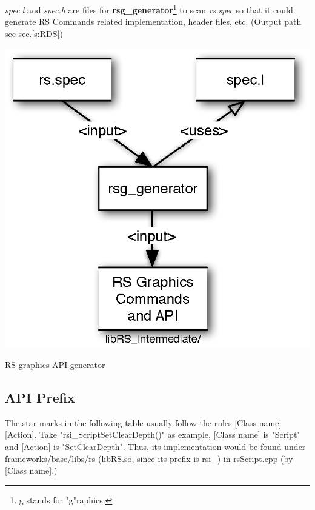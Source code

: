 \textit{spec.l} and \textit{spec.h} are files for \textbf{rsg\_generator}\footnote{g stands for "g"raphics.} to scan \textit{rs.spec} so that it could generate RS Commands related implementation, header files, etc. (Output path see sec.\ref{s:RDS})
\begin{center-figure}
	\includegraphics[scale=0.8]{fig/rsg_generator.eps}
	\caption{RS graphics API generator}
	\label{fig:rsg_generator}
\end{center-figure}

\subsection{API Prefix}
\label{ss:Prefix}
The star marks in the following table usually follow the rules [Class name][Action]. Take "rsi\_ScriptSetClearDepth()" as example, [Class name] is "Script" and [Action] is "SetClearDepth". Thus, its implementation would be found under frameworks/base/libs/rs (libRS.so, since its prefix is rsi\_) in rsScript.cpp (by [Class name].)

\addtocounter{footnote}{1}
\addtocounter{footnote}{1}
\footnotetext[\value{footnote}]{The rs*() finally routes here}
\addtocounter{footnote}{1}
\footnotetext[\value{footnote}]{an integer constant} 
\addtocounter{footnote}{1}
\addtocounter{footnote}{-4}
 
